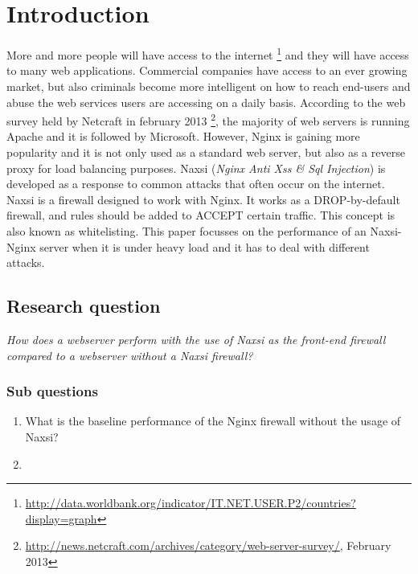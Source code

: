 \documentclass[Introduction]{subfiles}
\begin{document}
\section{Introduction}
\label{sec:Introduction}
More and more people will have access to the internet \footnote{\url{http://data.worldbank.org/indicator/IT.NET.USER.P2/countries?display=graph}} and they will have access to many web applications. Commercial companies have access to an ever growing market, but also criminals become more intelligent on how to reach end-users and abuse the web services users are accessing on a daily basis.
According to the web survey held by Netcraft in february 2013 \footnote{\url{http://news.netcraft.com/archives/category/web-server-survey/}, February 2013}, the majority of web servers is running Apache and it is followed by Microsoft. However, Nginx is gaining more popularity and it is not only used as a standard web server, but also as a reverse proxy for load balancing purposes. Naxsi (\emph{Nginx Anti Xss \& Sql Injection}) is developed as a response to common attacks that often occur on the internet. Naxsi is a firewall designed to work with Nginx. It works as a DROP-by-default firewall, and rules should be added to ACCEPT certain traffic. This concept is also known as whitelisting.
This paper focusses on the performance of an Naxsi-Nginx server when it is under heavy load and it has to deal with different attacks. 

\subsection{Research question}
\emph{How does a webserver perform with the use of Naxsi as the front-end firewall compared to a webserver without a Naxsi firewall?}

\subsubsection{Sub questions}

\begin{enumerate}
\item What is the baseline performance of the Nginx firewall without the usage of Naxsi?
\item 
\end{enumerate}
\end{document}
